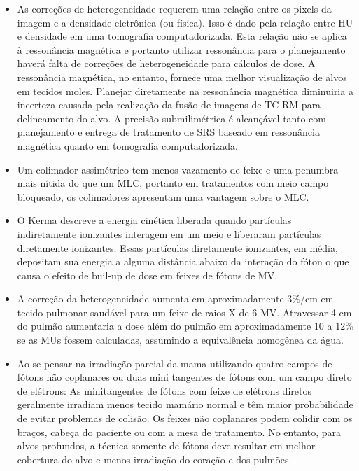 \documentclass[11pt,a4paper]{article}
\newcounter{exemplo}
\begin{document}
\begin{exemplo}[Radioterapia]
\begin{itemize}
        \item As correções de heterogeneidade requerem uma relação entre os pixels da imagem e a densidade eletrônica (ou física). Isso é dado pela relação entre HU e densidade em uma tomografia computadorizada. Esta relação não se aplica à ressonância magnética e portanto utilizar ressonância para o planejamento haverá falta de correções de heterogeneidade para cálculos de dose. A ressonância magnética, no entanto, fornece uma melhor visualização de alvos em tecidos moles. Planejar diretamente na ressonância magnética diminuiria a incerteza causada pela realização da fusão de imagens de TC-RM para delineamento do alvo. A precisão submilimétrica é alcançável tanto com planejamento e entrega de tratamento de SRS baseado em ressonância magnética quanto em tomografia computadorizada.
        
        \item Um colimador assimétrico tem menos vazamento de feixe e uma penumbra mais nítida do que um MLC, portanto em tratamentos com meio campo bloqueado, os colimadores apresentam uma vantagem sobre o MLC.
        
        \item O Kerma descreve a energia cinética liberada quando partículas indiretamente ionizantes interagem em um meio e liberaram partículas diretamente ionizantes. Essas partículas diretamente ionizantes, em média, depositam sua energia a alguma distância abaixo da interação do fóton o que causa o efeito de buil-up de dose em feixes de fótons de MV.
        
        \item A correção da heterogeneidade aumenta em aproximadamente 3\%/cm em tecido pulmonar saudável para um feixe de raios X de 6 MV. Atravessar 4 cm do pulmão aumentaria a dose além do pulmão em aproximadamente 10 a 12\% se as MUs fossem calculadas, assumindo a equivalência homogênea da água.
        
        \item Ao se pensar na irradiação parcial da mama utilizando quatro campos de fótons não coplanares ou duas mini tangentes de fótons com um campo direto de elétrons: As minitangentes de fótons com feixe de elétrons diretos geralmente irradiam menos tecido mamário normal e têm maior probabilidade de evitar problemas de colisão. Os feixes não coplanares podem colidir com os braços, cabeça do paciente ou com a mesa de tratamento. No entanto, para alvos profundos, a técnica somente de fótons deve resultar em melhor cobertura do alvo e menos irradiação do coração e dos pulmões.
        

\end{itemize}
\end{exemplo}
\end{document}
